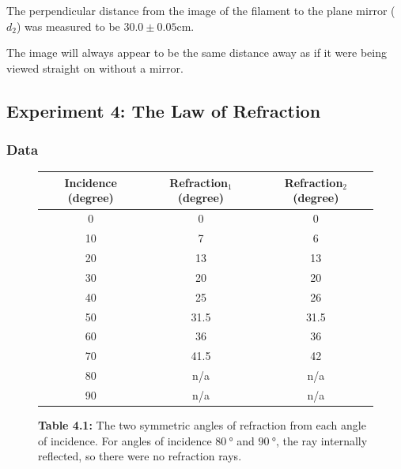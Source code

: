 \documentclass[12pt]{article}
\begin{document}
The perpendicular distance from the image of the filament to the plane mirror
(\(d_2\)) was measured to be \(30.0 \pm 0.05 \si{\centi\meter}\).

\subsubsubsection{}

The image will always appear to be the same distance away as if it were being
viewed straight on without a mirror.



\subsection{Experiment 4: The Law of Refraction}

\subsubsection{Data}

\begin{figure}[H]
  \label{tab:4.1}
  \caption{\textbf{Table 4.1:} The two symmetric angles of refraction from each
  angle of incidence. For angles of incidence \(\SI{80}{\degree}\) and
  \(\SI{90}{\degree}\), the ray internally reflected, so there were no
  refraction rays.}
  \begin{center}
    \begin{tabular}{|c|c|c|}
      \hline
      Incidence (\si{degree}) & Refraction\(_1\) (\si{degree}) &
                                                                 Refraction\(_2\)
                                                                 (\si{degree})
      \\
      \hline
      0  & 0    & 0 \\
      10 & 7    & 6 \\
      20 & 13   & 13 \\
      30 & 20   & 20 \\
      40 & 25   & 26 \\
      50 & 31.5 & 31.5 \\
      60 & 36   & 36 \\
      70 & 41.5 & 42 \\
      80 & n/a  & n/a \\
      90 & n/a  & n/a \\
      \hline
      \end{tabular}
      \end{center}
\end{figure}
\end{document}
